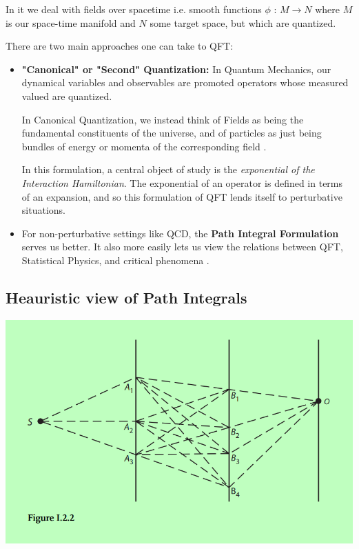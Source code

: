 \documentclass[11pt]{article}
\begin{document}
\vskip 0.5cm
In it we deal with fields over spacetime i.e. smooth functions $\phi \text{ : } M \rightarrow N$ where $M$ is our space-time manifold and $N$ some target space, but which are quantized.

\vskip 0.5cm
There are two main approaches one can take to QFT:

\begin{itemize}
    \item \textbf{"Canonical" or "Second" Quantization:} In Quantum Mechanics, our dynamical variables and observables are promoted operators whose measured valued are quantized. 
    

    In Canonical Quantization, we instead think of Fields as being the fundamental constituents of the universe, and of particles as just being bundles of energy or momenta of the corresponding field \cite{Weinberg97}.
    
    In this formulation, a central object of study is the \emph{exponential of the Interaction Hamiltonian}. The exponential of an operator is defined in terms of an expansion, and so this formulation of QFT lends itself to perturbative situations. 
    
    \item For non-perturbative settings like QCD, the \textbf{Path Integral Formulation} serves us better. It also more easily lets us view the relations between QFT, Statistical Physics, and critical phenomena \cite{Maggiore05}.
\end{itemize}

\vskip 0.5cm
\subsection{Heauristic view of Path Integrals}

\vskip 0.5cm
\begin{center}
    \includegraphics[scale=0.5]{multiple_slits.png}
\end{center}
\end{document}
